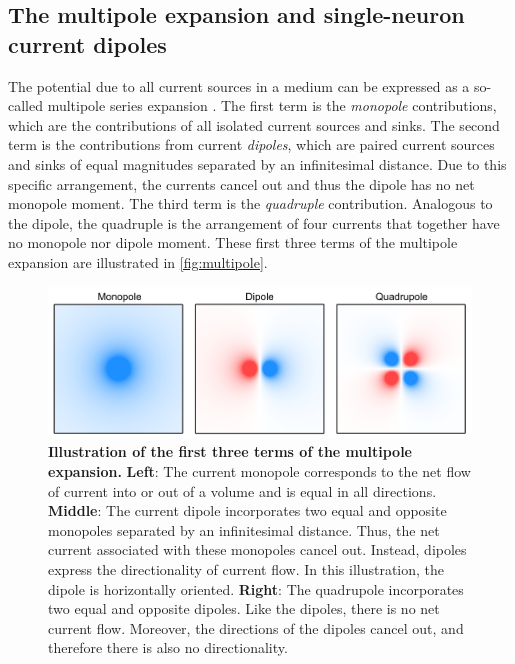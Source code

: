 \subsection{The multipole expansion and single-neuron current dipoles}
The potential due to all current sources in a medium can be expressed as a so-called multipole series expansion \cite{Nunez2006}. The first term is the \textit{monopole} contributions, which are the contributions of all isolated current sources and sinks. The second term is the contributions from current \textit{dipoles}, which are paired current sources and sinks of equal magnitudes separated by an infinitesimal distance. Due to this specific arrangement, the currents cancel out and thus the dipole has no net monopole moment. The third term is the \textit{quadruple} contribution. Analogous to the dipole, the quadruple is the arrangement of four currents that together have no monopole nor dipole moment. These first three terms of the multipole expansion are illustrated in \autoref{fig:multipole}. 

\begin{figure}[h!]
	\centering
	\includegraphics[width=.8\textwidth]{Figures/chapter1/multipole_expansion.pdf}
    
    \caption{\textbf{Illustration of the first three terms of the multipole expansion.} \textbf{Left}: The current monopole corresponds to the net flow of current into or out of a volume and is equal in all directions. \textbf{Middle}: The current dipole incorporates two equal and opposite monopoles separated by an infinitesimal distance. Thus, the net current associated with these monopoles cancel out. Instead, dipoles express the directionality of current flow. In this illustration, the dipole is horizontally oriented. \textbf{Right}: The quadrupole incorporates two equal and opposite dipoles. Like the dipoles, there is no net current flow. Moreover, the directions of the dipoles cancel out, and therefore there is also no directionality. } 
    \label{fig:multipole}
\end{figure}

